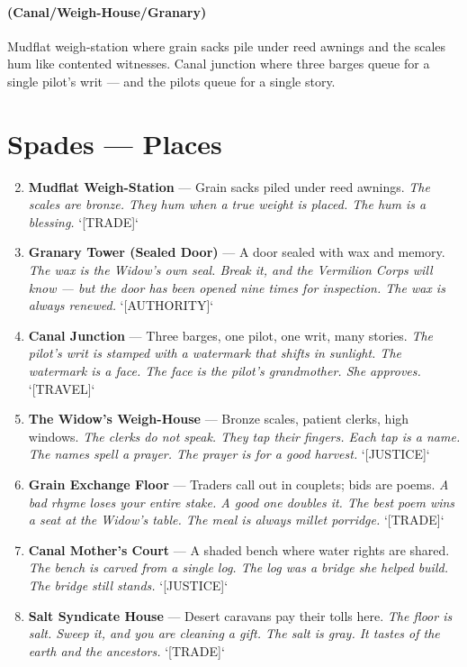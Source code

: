 \paragraph*{(Canal/Weigh-House/Granary)} Mudflat weigh-station where grain sacks pile under reed awnings and the scales hum like contented witnesses. Canal junction where three barges queue for a single pilot's writ --- and the pilots queue for a single story.

\section*{Spades --- Places}
\label{sec:oshiira-places}
\begin{enumerate}
\setcounter{enumi}{1}
\item \textbf{Mudflat Weigh-Station} --- Grain sacks piled under reed awnings.
  \hfill \textit{The scales are bronze. They hum when a true weight is placed. The hum is a blessing.} `[TRADE]`
\item \textbf{Granary Tower (Sealed Door)} --- A door sealed with wax and memory.
  \hfill \textit{The wax is the Widow's own seal. Break it, and the Vermilion Corps will know --- but the door has been opened nine times for inspection. The wax is always renewed.} `[AUTHORITY]`
\item \textbf{Canal Junction} --- Three barges, one pilot, one writ, many stories.
  \hfill \textit{The pilot's writ is stamped with a watermark that shifts in sunlight. The watermark is a face. The face is the pilot's grandmother. She approves.} `[TRAVEL]`
\item \textbf{The Widow's Weigh-House} --- Bronze scales, patient clerks, high windows.
  \hfill \textit{The clerks do not speak. They tap their fingers. Each tap is a name. The names spell a prayer. The prayer is for a good harvest.} `[JUSTICE]`
\item \textbf{Grain Exchange Floor} --- Traders call out in couplets; bids are poems.
  \hfill \textit{A bad rhyme loses your entire stake. A good one doubles it. The best poem wins a seat at the Widow's table. The meal is always millet porridge.} `[TRADE]`
\item \textbf{Canal Mother's Court} --- A shaded bench where water rights are shared.
  \hfill \textit{The bench is carved from a single log. The log was a bridge she helped build. The bridge still stands.} `[JUSTICE]`
\item \textbf{Salt Syndicate House} --- Desert caravans pay their tolls here.
  \hfill \textit{The floor is salt. Sweep it, and you are cleaning a gift. The salt is gray. It tastes of the earth and the ancestors.} `[TRADE]`

\end{enumerate}
